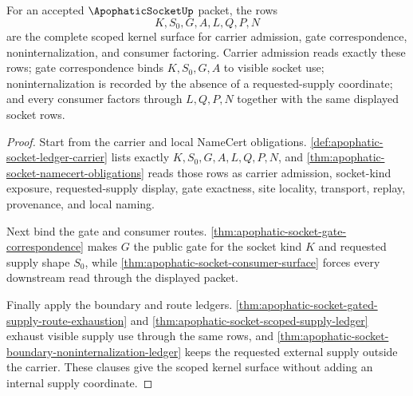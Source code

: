 \begin{theorem}
\label{thm:apophatic-socket-kernel-scope-obligation-package}
For an accepted $\ApophaticSocketUp$ packet, the rows
$$
K,S_0,G,A,L,Q,P,N
$$
are the complete scoped kernel surface for carrier admission, gate correspondence, noninternalization, and consumer factoring. Carrier admission reads exactly these rows; gate correspondence binds $K,S_0,G,A$ to visible socket use; noninternalization is recorded by the absence of a requested-supply coordinate; and every consumer factors through $L,Q,P,N$ together with the same displayed socket rows.
\end{theorem}
\begin{proof}
Start from the carrier and local NameCert obligations. \autoref{def:apophatic-socket-ledger-carrier} lists exactly $K,S_0,G,A,L,Q,P,N$, and \autoref{thm:apophatic-socket-namecert-obligations} reads those rows as carrier admission, socket-kind exposure, requested-supply display, gate exactness, site locality, transport, replay, provenance, and local naming.

Next bind the gate and consumer routes. \autoref{thm:apophatic-socket-gate-correspondence} makes $G$ the public gate for the socket kind $K$ and requested supply shape $S_0$, while \autoref{thm:apophatic-socket-consumer-surface} forces every downstream read through the displayed packet.

Finally apply the boundary and route ledgers. \autoref{thm:apophatic-socket-gated-supply-route-exhaustion} and \autoref{thm:apophatic-socket-scoped-supply-ledger} exhaust visible supply use through the same rows, and \autoref{thm:apophatic-socket-boundary-noninternalization-ledger} keeps the requested external supply outside the carrier. These clauses give the scoped kernel surface without adding an internal supply coordinate.
\end{proof}

